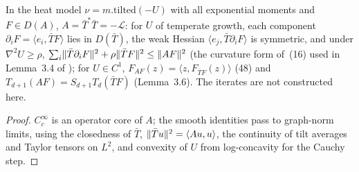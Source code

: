 \begin{lemma}
  \label{lem:bkl-generator-domain}
  \leanok
  In the heat model $\nu=m.\mathrm{tilted}(-U)$ with all exponential moments and $F\in D(A)$,
  $A=\bar T^*\bar T=-\mathcal L$: for $U$ of temperate growth, each component
  $\partial_iF=\langle e_i,\bar TF\rangle$ lies in $D(\bar T)$, the weak Hessian
  $\langle e_j,\bar T\partial_iF\rangle$ is symmetric, and under $\nabla^2U\ge\rho$,
  $\sum_i\lVert\bar T\partial_iF\rVert^2+\rho\lVert\bar TF\rVert^2\le\lVert AF\rVert^2$ (the curvature form of~(16) used
  in Lemma~3.4 of \cite{BizeulKlartagLehec2026}); for $U\in C^1$, $F_{AF}(z)=\langle z,F_{\bar TF}(z)\rangle$
  (48) and $T_{d+1}(AF)=S_{d+1}T_d(\bar TF)$ (Lemma~3.6).  The iterates are not constructed here.
\end{lemma}
\begin{proof}
  \leanok
  $C_c^\infty$ is an operator core of $A$; the smooth identities pass to graph-norm limits, using the
  closedness of $\bar T$, $\lVert\bar Tu\rVert^2=\langle Au,u\rangle$, the continuity of tilt averages and
  Taylor tensors on $L^2$, and convexity of $U$ from log-concavity for the Cauchy step.
\end{proof}

